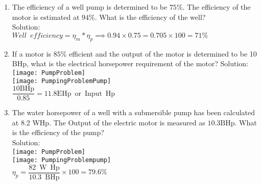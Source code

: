 \begin{enumerate}
\item The efficiency of a well pump is determined to be $75 \%$. The efficiency of the motor is estimated at $94 \%$. What is the efficiency of the well?\\
 \vspace{0.2cm}
Solution:\\ 
 \vspace{0.2cm}
$Well \enspace efficiency=\eta_m * \eta_p \implies 0.94 \times 0.75=0.705 \times 100=\boxed{71 \%}$
 \vspace{0.2cm}

 \item If a motor is $85 \%$ efficient and the output of the motor is determined to be 10 $\mathrm{BHp}$, what is the electrical horsepower requirement of the motor?
 \vspace{0.2cm}
Solution:\\ 
 \vspace{0.2cm}
\texttt{[image: PumpProblem]}\\
 \vspace{0.2cm}
 \texttt{[image: PumpingProblemPump]}\\
 \vspace{0.2cm}
$\dfrac{10 \mathrm{BHp}}{0.85}=\boxed{11.8 \mathrm{EHp \enspace or \enspace Input \enspace Hp}}$
 \vspace{0.2cm}

\item The water horsepower of a well with a submersible pump has been calculated at 8.2 WHp. The Output of the electric motor is measured as $10.3 \mathrm{BHp}$. What is the efficiency of the pump?\\
 \vspace{0.2cm}
Solution:\\ 
 \vspace{0.2cm}
\texttt{[image: PumpProblem]}\\
 \vspace{0.2cm}
 \texttt{[image: PumpingProblempump]}\\
 \vspace{0.2cm}
$\eta_p=\dfrac{82 \mathrm{\enspace W \enspace Hp}}{10.3 \mathrm{\enspace BHp}} \times 100=\boxed{79.6 \%}$
 \vspace{0.2cm}
 
 \vspace{0.2cm}



\end{enumerate}
